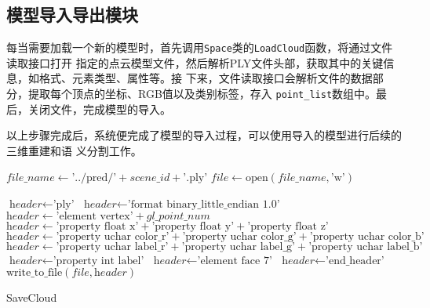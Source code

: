 \subsection{模型导入导出模块}

\par 每当需要加载一个新的模型时，首先调用\texttt{Space}类的\texttt{LoadCloud}函数，将通过文件读取接口打开
指定的点云模型文件，然后解析PLY文件头部，获取其中的关键信息，如格式、元素类型、属性等。接
下来，文件读取接口会解析文件的数据部分，提取每个顶点的坐标、RGB值以及类别标签，存入
\texttt{point\_list}数组中。最后，关闭文件，完成模型的导入。

\par 以上步骤完成后，系统便完成了模型的导入过程，可以使用导入的模型进行后续的三维重建和语
义分割工作。

\begin{algorithm}[htbp]
    \SetAlgoLined
    $\textit{file\_name} \gets \text{'../pred/'} + \textit{scene\_id} + \text{'.ply'}$\;
    $\textit{file} \gets \text{open}(\textit{file\_name}, \text{'w'})$\;

    $\textit{header} \gets \text{'ply'}$\;
    $\textit{header} \gets \text{'format binary\_little\_endian 1.0'}$\;
    $\textit{header} \gets \text{'element vertex'} + \textit{gl\_point\_num}$\;
    $\textit{header} \gets \text{'property float x'} + \text{'property float y'} + \text{'property float z'}$\;
    $\textit{header} \gets \text{'property uchar color\_r'} + \text{'property uchar color\_g'} + \text{'property uchar color\_b'}$\;
    $\textit{header} \gets \text{'property uchar label\_r'} + \text{'property uchar label\_g'} + \text{'property uchar label\_b'}$\;
    $\textit{header} \gets \text{'property int label'}$\;
    $\textit{header} \gets \text{'element face 7'}$\;
    $\textit{header} \gets \text{'end\_header'}$\;
    $\text{write\_to\_file}(\textit{file}, \textit{header})$\;

    \caption{SaveCloud}
    \label{algo:SaveCloud}
\end{algorithm}

